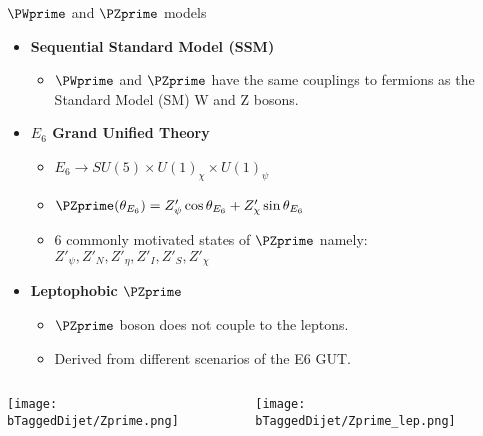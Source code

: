 \documentclass[8pt]{beamer}
\begin{document}
\begin{frame}{\large $\PWprime$ and $\PZprime$ models}
\begin{itemize}
 \item \textbf{Sequential Standard Model (SSM)}
  \begin{itemize}
    \item $\PWprime$ and $\PZprime$ have the same couplings to fermions as the Standard Model (SM) W and Z bosons.
  \end{itemize}
 \item \textbf{$E_6$ Grand Unified Theory}
  \begin{itemize}
    \item $E_6 \rightarrow SU(5) \times U(1)_{\chi} \times U(1)_{\psi}$
    \item $\PZprime(\theta_{E_6}) = Z'_{\psi}\cos\theta_{E_6} + Z'_{\chi}\sin\theta_{E_6}$
    \item 6 commonly motivated states of $\PZprime$ namely:
	  $Z'_{\psi}, Z'_{N}, Z'_{\eta}, Z'_{I}, Z'_{S}, Z'_{\chi}$
  \end{itemize}
 \item \textbf{Leptophobic $\PZprime$}
 \begin{itemize}
  \item $\PZprime$ boson does not couple to the leptons.
  \item Derived from different scenarios of the E6 GUT.
 \end{itemize}
 
 
\end{itemize}
  
\begin{columns}
 \begin{column}{6cm}
  \texttt{[image: bTaggedDijet/Zprime.png]}\\
 \end{column}
 \begin{column}{6cm}
  \texttt{[image: bTaggedDijet/Zprime\_lep.png]}\\
 \end{column}
\end{columns}

\end{frame}
\end{document}
